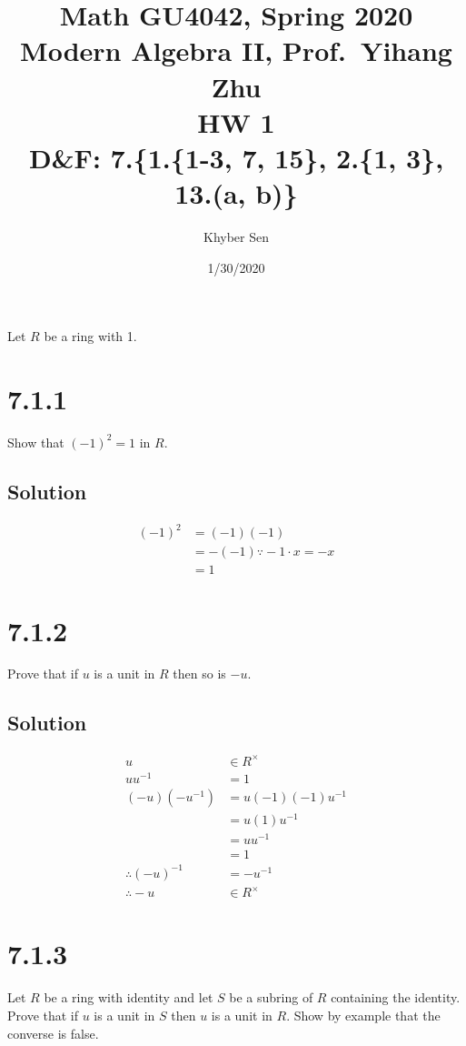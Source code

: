 \documentclass[fleqn]{article}
\title{
Math GU4042, Spring 2020 \\
Modern Algebra II, Prof.\ Yihang Zhu \\
HW 1 \\
D\&F: 7.\{1.\{1-3, 7, 15\}, 2.\{1, 3\}, 13.(a, b)\}
}
\author{Khyber Sen}
\date{1/30/2020}
\begin{document}
    
    \maketitle
    
    Let $R$ be a ring with 1.
    
    \section{7.1.1}
    Show that $(-1)^2 = 1$ in $R$.
        
        \subsection{Solution}
        \begin{align}
            (-1)^2 &= (-1)(-1) \\
                &= -(-1) \because{} -1 \cdot x = -x \\
                &= 1
        \end{align}
    
    \section{7.1.2}
    Prove that if $u$ is a unit in $R$ then so is $-u$.
        
        \subsection{Solution}
        \begin{align}
            u &\in R^\times \\
            u u^{-1} &= 1 \\
            (-u)(-u^{-1}) &= u (-1)(-1) u^{-1} \\
                &= u (1) u^{-1} \\
                &= u u^{-1} \\
                &= 1 \\
            \therefore{} (-u)^{-1} &= -u^{-1} \\
            \therefore{} -u &\in R^\times
        \end{align}
    
    \section{7.1.3}
    Let $R$ be a ring with identity and let $S$ be a subring of $R$ containing the identity.  Prove that if $u$ is a unit in $S$ then $u$ is a unit in $R$.  Show by example that the converse is false.
        
\end{document}
